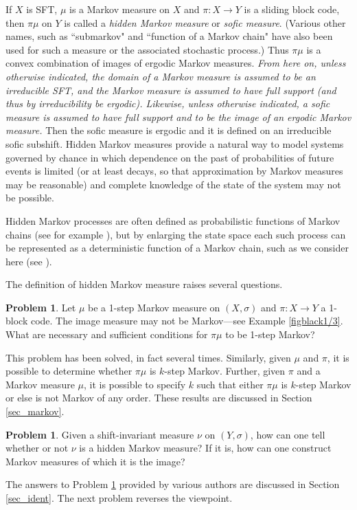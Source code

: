 \documentclass{kepart2010}
\theoremstyle{plain}
\theoremstyle{definition}
\newtheorem{prob}[thm]{Problem}
\theoremstyle{remark}
\theoremstyle{definition}
\numberwithin{equation}{section}
\begin{document}
 If $X$ is SFT, $\mu$ is a Markov measure on $X$ and $\pi: X \to
Y$ is a sliding block code, then $\pi\mu$ on $Y$ is called a {\em
hidden Markov measure}
 or {\em sofic measure}.
(Various other names, such as ``submarkov" and ``function of a
Markov chain" have also been used for such a measure or the
 associated stochastic process.)
{}{Thus $\pi \mu$ is a convex combination of images of ergodic
Markov measures.
 {\em From here on, unless
otherwise indicated, the
domain of a Markov measure is assumed to be an irreducible SFT, and
the Markov measure is assumed to have full support (and thus by
irreducibility be ergodic).
 Likewise, unless otherwise indicated, a
sofic measure is assumed to have full support and to be the image of
an ergodic Markov measure.}} Then the sofic measure is ergodic and it
is defined on an irreducible sofic subshift.
 Hidden Markov measures provide a natural way to model
systems governed by chance in which dependence on the past of
probabilities of future events is limited (or at least decays, so
that approximation by Markov measures may be reasonable) and
complete knowledge of the state of the system may not be possible.

Hidden Markov processes are often defined as probabilistic functions
of Markov chains (see for example \cite{EphraimMerhav2002}), but by
enlarging the state space each such process can be represented as a
deterministic function of a Markov chain, such as we consider here
(see \cite{BaumPetrie1966}).

The definition of hidden Markov measure raises several questions.
\begin{prob}\label{prob_markovimage}
Let $\mu$ be a 1-step Markov measure on $(X,\sigma)$ and $\pi :X \to
Y$ a 1-block code. The image measure may not be Markov---see Example
\ref{figblack1/3}. What are necessary and sufficient conditions for
$\pi\mu$ to be 1-step Markov?
\end{prob}
This problem has been solved, in fact several times.
Similarly,
given $\mu$ and $\pi$, it is possible to determine whether $\pi\mu$
is $k$-step Markov. Further, given $\pi$ and a Markov measure $\mu$,
it is possible to specify $k$ such that either $\pi\mu$ is $k$-step
Markov or else is not Markov of any order. These results are
discussed in Section \ref{sec_markov}.

\begin{prob}\label{prob_identify}
Given a shift-invariant measure $\nu$ on $(Y,\sigma)$, how can one
tell whether or not $\nu$ is a hidden Markov measure? If it is, how
can one construct Markov measures of which it is the image?
\end{prob}
The answers to Problem \ref{prob_identify}
provided by various authors are discussed in Section
\ref{sec_ident}. The next problem reverses the viewpoint.
\end{document}
